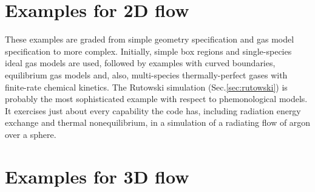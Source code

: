 \documentclass[12pt,a4paper,twoside]{article}
\begin{document}
\part{Examples for 2D flow}
%
These examples are graded from simple geometry specification and gas model specification
to more complex.
Initially, simple box regions and single-species ideal gas models are used, followed by
examples with curved boundaries, equilibrium gas models and, also, 
multi-species thermally-perfect gases with finite-rate chemical kinetics.
The Rutowski simulation (Sec.\ref{sec:rutowski}) is probably the most sophisticated example
with respect to phemonological models.
It exercises just about every capability the code has, 
including radiation energy exchange and thermal nonequilibrium,
in a simulation of a radiating flow of argon over a sphere.


\cleardoublepage

\cleardoublepage

\cleardoublepage

\cleardoublepage

\cleardoublepage

\cleardoublepage

\cleardoublepage

\cleardoublepage

\cleardoublepage

\cleardoublepage

\cleardoublepage

\cleardoublepage

\cleardoublepage

\cleardoublepage

\cleardoublepage

\cleardoublepage

\cleardoublepage

\cleardoublepage

\cleardoublepage

\cleardoublepage

\cleardoublepage

\cleardoublepage

\cleardoublepage

\cleardoublepage

\cleardoublepage

\cleardoublepage
%

\cleardoublepage

\cleardoublepage

\cleardoublepage

\part{Examples for 3D flow}
%


\cleardoublepage

\cleardoublepage

\cleardoublepage

\cleardoublepage

\cleardoublepage

\cleardoublepage

\cleardoublepage

\cleardoublepage

\cleardoublepage
\end{document}
